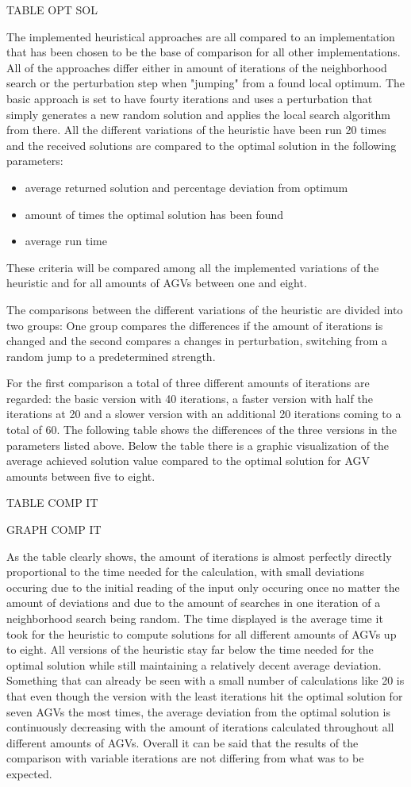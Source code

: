 TABLE OPT SOL

The implemented heuristical approaches are all compared to an implementation that has been chosen to be the base of comparison for all other implementations. All of the approaches differ either in amount of iterations of the neighborhood search or the perturbation step when "jumping" from a found local optimum. The basic approach is set to have fourty iterations and uses a perturbation that simply generates a new random solution and applies the local search algorithm from there. All the different variations of the heuristic have been run 20 times and the received solutions are compared to the optimal solution in the following parameters:
\begin{itemize}
\item average returned solution and percentage deviation from optimum
\item amount of times the optimal solution has been found
\item average run time
\end{itemize}
These criteria will be compared among all the implemented variations of the heuristic and for all amounts of AGVs between one and eight.

The comparisons between the different variations of the heuristic are divided into two groups: One group compares the differences if the amount of iterations is changed and the second compares a changes in perturbation, switching from a random jump to a predetermined strength.

For the first comparison a total of three different amounts of iterations are regarded: the basic version with 40 iterations, a faster version with half the iterations at 20 and a slower version with an additional 20 iterations coming to a total of 60. The following table shows the differences of the three versions in the parameters listed above. Below the table there is a graphic visualization of the average achieved solution value compared to the optimal solution for AGV amounts between five to eight.

TABLE COMP IT

GRAPH COMP IT

As the table clearly shows, the amount of iterations is almost perfectly directly proportional to the time needed for the calculation, with small deviations occuring due to the initial reading of the input only occuring once no matter the amount of deviations and due to the amount of searches in one iteration of a neighborhood search being random. The time displayed is the average time it took for the heuristic to compute solutions for all different amounts of AGVs up to eight. All versions of the heuristic stay far below the time needed for the optimal solution while still maintaining a relatively decent average deviation. Something that can already be seen with a small number of calculations like 20 is that even though the version with the least iterations hit the optimal solution for seven AGVs the most times, the average deviation from the optimal solution is continuously decreasing with the amount of iterations calculated throughout all different amounts of AGVs. Overall it can be said that the results of the comparison with variable iterations are not differing from what was to be expected.

